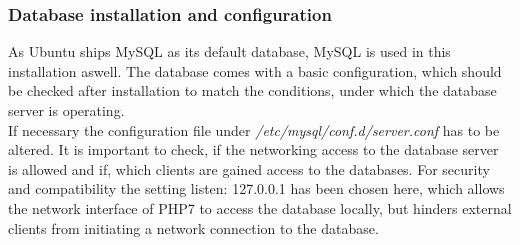 \subsubsection{Database installation and configuration}
As Ubuntu ships MySQL as its default database, MySQL is used in this installation aswell. The database comes with a basic configuration, which should be checked after installation
to match the conditions, under which the database server is operating.\\
If necessary the configuration file under \emph{/etc/mysql/conf.d/server.conf} has to be altered. It is important to check, if the networking access to the database server is allowed and 
if, which clients are gained access to the databases. For security and compatibility the setting listen: 127.0.0.1 has been chosen here, which allows the network interface of PHP7
to access the database locally, but hinders external clients from initiating a network connection to the database.


